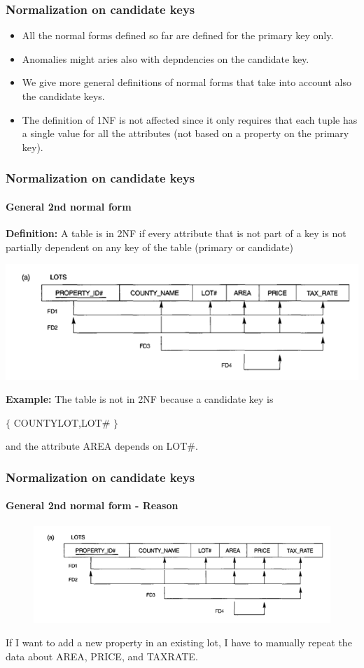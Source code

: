 \documentclass{beamer}
\newcommand{\valseq}[1]{$\lbrace$ #1 $\rbrace$}
\begin{document}

\begin{frame}
	\frametitle{Normalization on candidate keys}
	
	\begin{itemize}
		\item All the normal forms defined so far are defined for the primary key only.
		\item Anomalies might aries also with depndencies on the candidate key.
		\item We give more general definitions of normal forms that take into account also the candidate keys.
		\item The definition of 1NF is not affected since it only requires that each tuple has a single value for all the attributes (not based on a property on the primary key).		
	\end{itemize}
\end{frame}

\begin{frame}
	\frametitle{Normalization on candidate keys}
	\framesubtitle{General 2nd normal form}
	
	\textbf{Definition:}
	A table is in 2NF if every attribute that is not part of a key is not partially dependent on any key of the table (primary or candidate)
	
	\includegraphics[scale=0.4]{img/normalization/norm12}
	
	\textbf{Example:}
	The table is not in 2NF because a candidate key is
	
	\valseq{COUNTY\textunderscore LOT,LOT\#} 
	
	and the attribute AREA depends on LOT\#.
\end{frame}

\begin{frame}
	\frametitle{Normalization on candidate keys}
	\framesubtitle{General 2nd normal form - Reason}
	
	\begin{figure}
		\includegraphics[scale=0.4]{img/normalization/norm12}
	\end{figure}
	
	If I want to add a new property in an existing lot, I have to manually repeat the data about AREA, PRICE, and TAX\textunderscore RATE.
\end{frame}
\end{document}
